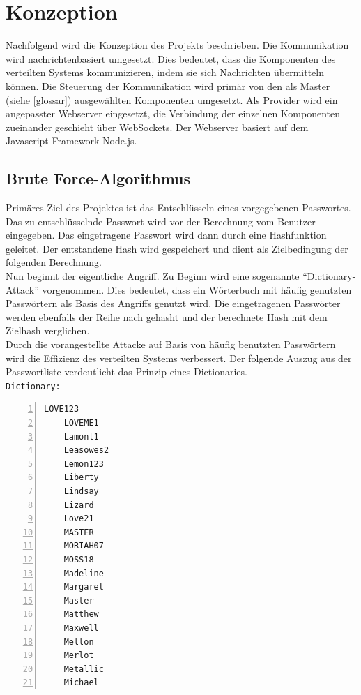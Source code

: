 \chapter{Konzeption}
\label{Konzeption}
Nachfolgend wird die Konzeption des Projekts beschrieben. 
Die Kommunikation wird nachrichtenbasiert umgesetzt. Dies bedeutet, dass die Komponenten des verteilten Systems kommunizieren, indem sie sich Nachrichten übermitteln können. Die Steuerung der Kommunikation wird primär von den als Master 
(siehe \ref{glossar}) ausgewählten Komponenten umgesetzt. Als Provider wird ein angepasster Webserver eingesetzt, die Verbindung der einzelnen Komponenten zueinander geschieht über WebSockets. Der Webserver basiert auf dem Javascript-Framework Node.js. \\


\section{Brute Force-Algorithmus}
\label{ideeBruteForce}
Primäres Ziel des Projektes ist das Entschlüsseln eines vorgegebenen Passwortes. Das zu entschlüsselnde Passwort wird vor der Berechnung vom Benutzer eingegeben. Das eingetragene Passwort wird dann durch eine Hashfunktion geleitet. Der entstandene Hash wird gespeichert und dient als Zielbedingung der folgenden Berechnung. \\
Nun beginnt der eigentliche Angriff. Zu Beginn wird eine sogenannte \enquote{Dictionary-Attack} vorgenommen. Dies bedeutet, dass ein Wörterbuch mit häufig genutzten Passwörtern als Basis des Angriffs genutzt wird. Die eingetragenen Passwörter werden ebenfalls der Reihe nach gehasht und der berechnete Hash mit dem Zielhash verglichen. \\
 Durch die vorangestellte Attacke auf Basis von häufig benutzten Passwörtern wird die Effizienz des verteilten Systems verbessert. Der folgende Auszug aus der Passwortliste  verdeutlicht das Prinzip eines Dictionaries. \\
\texttt{Dictionary:}
\begin{lstlisting}[basicstyle=\ttfamily,numbers=left,numberstyle=\footnotesize\ttfamily,backgroundcolor=\color{sourcegray}]
	LOVE123
	LOVEME1
	Lamont1
	Leasowes2
	Lemon123
	Liberty
	Lindsay
	Lizard
	Love21
	MASTER
	MORIAH07
	MOSS18
	Madeline
	Margaret
	Master
	Matthew
	Maxwell
	Mellon
	Merlot
	Metallic
	Michael
\end{lstlisting}



